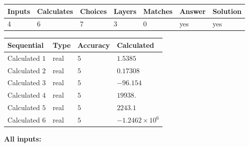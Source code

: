 \documentclass[12pt]{article}
\begin{document}
 

 
\vspace{0.3in}
   
   
   
   
\noindent\begin{tabular}{|l|l|l|l|l|l|l|}
 \hline
Inputs & Calculates & Choices & Layers & Matches & Answer & Solution \\ \hline
           4  & 
           6  & 
           7
  & 
           3  & 
           0  & 
  yes & 
  yes 
  \\ \hline
 \end{tabular}
   
   
   
   
\noindent{}
   
   
  
  
\noindent\begin{tabular}{|l|l|l|l|}
\hline
 Sequential & Type & Accuracy & Calculated \\ 
\hline
 
 
  Calculated $            1 $ & real & $            5  $ & 
 $ 1.5385 $ 
 \\  \hline  
 
 
  Calculated $            2 $ & real & $            5  $ & 
 $ 0.17308 $ 
 \\  \hline  
 
 
  Calculated $            3 $ & real & $            5  $ & 
 $ -96.154 $ 
 \\  \hline  
 
 
  Calculated $            4 $ & real & $            5  $ & 
 $ 19938. $ 
 \\  \hline  
 
 
  Calculated $            5 $ & real & $            5  $ & 
 $ 2243.1 $ 
 \\  \hline  
 
 
  Calculated $            6 $ & real & $            5  $ & 
 $ -1.2462 \times 10^{6} $ 
 \\  \hline  
 \end{tabular}
   
   
   
   
\noindent\vspace{0.1in}\hspace{-0.08in} {\textbf{\Large{All inputs: }}}
   
   
  
\end{document}
